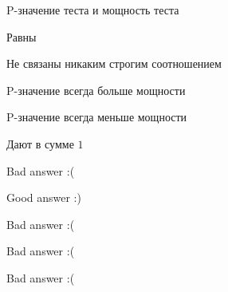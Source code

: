 
\begin{question}
P-значение теста и мощность теста
\begin{answerlist}
  \item Равны
  \item Не связаны никаким строгим соотношением
  \item P-значение всегда больше мощности
  \item P-значение всегда меньше мощности
  \item Дают в сумме \(1\)
\end{answerlist}
\end{question}

\begin{solution}
\begin{answerlist}
  \item Bad answer :(
  \item Good answer :)
  \item Bad answer :(
  \item Bad answer :(
  \item Bad answer :(
\end{answerlist}
\end{solution}

